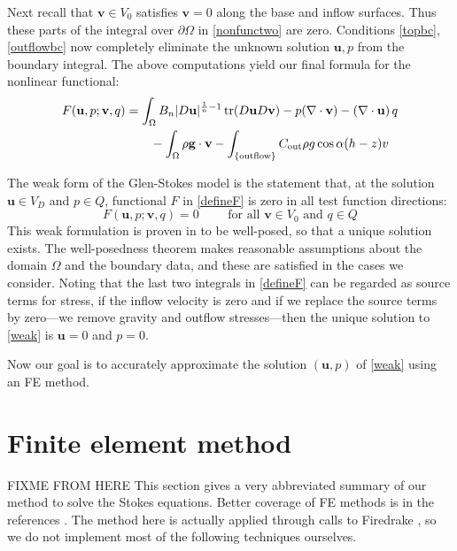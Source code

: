 \documentclass[letterpaper,final,12pt,reqno]{amsart}
\newcommand{\trace}{\operatorname{tr}}
\newcommand{\bu}{\mathbf{u}}
\newcommand{\bv}{\mathbf{v}}
\begin{document}
Next recall that $\bv\in V_0$ satisfies $\bv=0$ along the base and inflow surfaces.  Thus these parts of the integral over $\partial\Omega$ in \eqref{nonfunctwo} are zero.  Conditions \eqref{topbc}, \eqref{outflowbc} now completely eliminate the unknown solution $\bu,p$ from the boundary integral.  The above computations yield our final formula for the nonlinear functional:
\begin{align}
F(\bu,p;\bv,q) &= \int_\Omega B_n |D\bu|^{\frac{1}{n} - 1} \trace(D\bu D\bv) - p (\nabla \cdot \bv) - \left(\nabla \cdot \bu\right) q \label{defineF} \\
    &\qquad  - \int_\Omega \rho \mathbf{g} \cdot \bv - \int_{\{\text{outflow}\}} C_{\text{out}} \rho g \cos\alpha (h-z) v  \notag
\end{align}

The weak form of the Glen-Stokes model is the statement that, at the solution $\bu\in V_D$ and $p\in Q$, functional $F$ in \eqref{defineF} is zero in all test function directions:
\begin{equation}
F(\bu,p;\bv,q) = 0 \qquad \text{ for all } \bv\in V_0 \text{ and } q\in Q  \label{weak}
\end{equation}
This weak formulation is proven in \cite[Theorem 3.8]{JouvetRappaz2011} to be well-posed, so that a unique solution exists.  The well-posedness theorem makes reasonable assumptions about the domain $\Omega$ and the boundary data, and these are satisfied in the cases we consider.  Noting that the last two integrals in \eqref{defineF} can be regarded as source terms for stress, if the inflow velocity is zero and if we replace the source terms by zero---we remove gravity and outflow stresses---then the unique solution to \eqref{weak} is $\bu=0$ and $p=0$.

Now our goal is to accurately approximate the solution $(\bu,p)$ of \eqref{weak} using an FE method.


\section{Finite element method} \label{sec:femethod}

FIXME FROM HERE This section gives a very abbreviated summary of our method to solve the Stokes equations.  Better coverage of FE methods is in the references \cite{Braess2007,Bueler2021,Elmanetal2014}.  The method here is actually applied through calls to Firedrake \cite{Rathgeberetal2016}, so we do not implement most of the following techniques ourselves.
\end{document}
